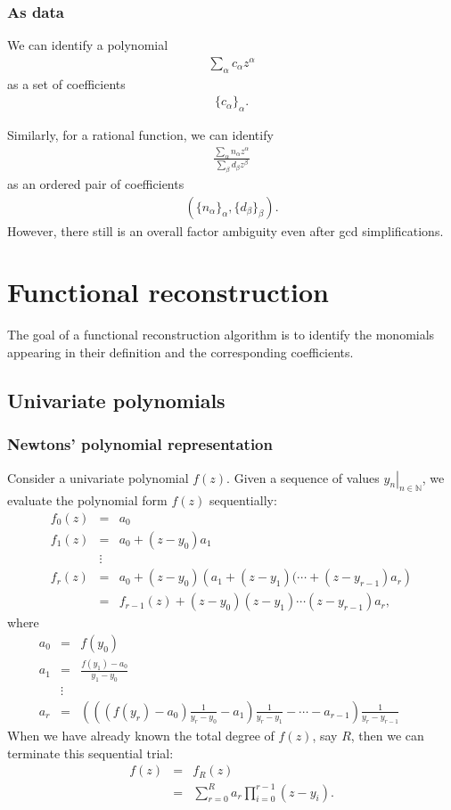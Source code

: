 \documentclass[11pt]{book}
\begin{document}
\subsection{As data}
We can identify a polynomial
\begin{eqnarray}
\sum_\alpha c_\alpha z^\alpha
\end{eqnarray}
as a set of coefficients
\begin{eqnarray}
\{ c_\alpha\}_{\alpha}.
\end{eqnarray}

Similarly, for a rational function, we can identify
\begin{eqnarray}
\frac{\sum_\alpha n_\alpha z^\alpha}{\sum_\beta d_\beta z^\beta}
\end{eqnarray}
as an ordered pair of coefficients
\begin{eqnarray}
(\{ n_\alpha\}_\alpha, \{ d_\beta\}_\beta).
\end{eqnarray}
However, there still is an overall factor ambiguity even after gcd simplifications.

\chapter{Functional reconstruction}
The goal of a functional reconstruction algorithm is to identify the monomials appearing in their definition and the corresponding coefficients.

\section{Univariate polynomials}
\subsection{Newtons' polynomial representation}
Consider a univariate polynomial $f(z)$.
Given a sequence of values $\left. y_n \right|_{n \in \mathbb{N}}$, we evaluate the polynomial form $f(z)$ sequentially:
\begin{eqnarray}
f_0(z) &=& a_0 \\
f_1(z) &=& a_0 + (z-y_0)a_1 \\
\nonumber
&\vdots& \\
f_r(z) &=& a_0 + (z-y_0) \left(a_1 + (z-y_1)(\cdots + (z - y_{r-1})a_r \right) \\
&=& f_{r-1}(z) + (z-y_0) (z-y_1) \cdots (z - y_{r-1})a_r,
\end{eqnarray}
where
\begin{eqnarray}
a_0 &=& f(y_0) \\
a_1 &=& \frac{f(y_1) - a_0}{y_1 - y_0} \\
\nonumber
&\vdots& \\
a_r &=& \left( \left( \left( f(y_r)-a_0 \right)\frac{1}{y_r - y_0} - a_1 \right)\frac{1}{y_r - y_1} - \cdots - a_{r-1} \right) \frac{1}{y_r - y_{r-1}} \qquad
\end{eqnarray}
When we have already known the total degree of $f(z)$, say $R$, then we can terminate this sequential trial:
\begin{eqnarray}
f(z) &=& f_R(z) \\
&=& \sum_{r=0}^R a_r \prod_{i=0}^{r-1}(z - y_i).
\end{eqnarray}
\end{document}
